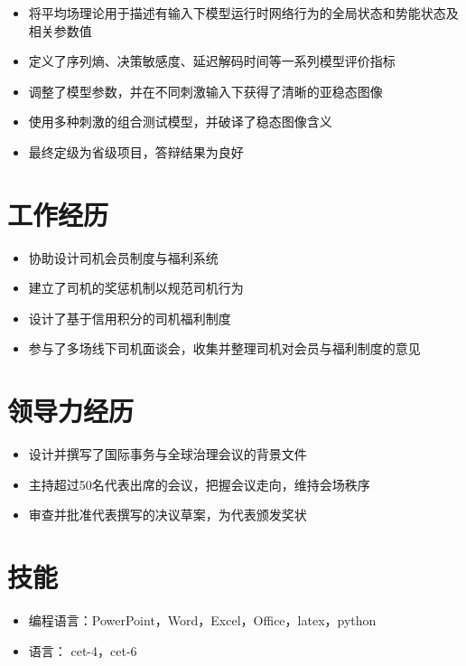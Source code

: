 \documentclass{resume}
\begin{document}

\begin{itemize}
  \item 将平均场理论用于描述有输入下模型运行时网络行为的全局状态和势能状态及相关参数值
  \item 定义了序列熵、决策敏感度、延迟解码时间等一系列模型评价指标
  \item 调整了模型参数，并在不同刺激输入下获得了清晰的亚稳态图像
  \item 使用多种刺激的组合测试模型，并破译了稳态图像含义
  \item 最终定级为省级项目，答辩结果为良好
\end{itemize}


\section{工作经历}
\begin{itemize}
  \item 协助设计司机会员制度与福利系统
  \item 建立了司机的奖惩机制以规范司机行为
  \item 设计了基于信用积分的司机福利制度
  \item 参与了多场线下司机面谈会，收集并整理司机对会员与福利制度的意见
\end{itemize}


\section{领导力经历}


\begin{itemize}
  \item 设计并撰写了国际事务与全球治理会议的背景文件
  \item 主持超过50名代表出席的会议，把握会议走向，维持会场秩序
  \item 审查并批准代表撰写的决议草案，为代表颁发奖状
\end{itemize}

\section{技能}
\begin{itemize}[parsep=0.5ex]
  \item 编程语言：PowerPoint，Word，Excel，Office，latex，python
  \item 语言： cet-4，cet-6
\end{itemize}
\end{document}
